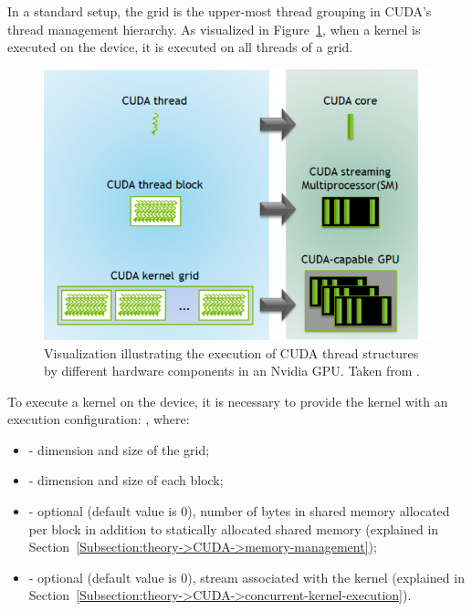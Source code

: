 In a standard setup, the grid is the upper-most thread grouping in CUDA's thread management hierarchy.
As visualized in Figure~\ref{Figure:theory->CUDA->thread-management->thread-structures-executed-by-hardware}, when a kernel is executed on the device, it is executed on all threads of a grid.

\begin{figure}[ht!]
	\centering
	\includegraphics[width=12cm, keepaspectratio]{images/ch01/CUDA_structures_executed_by_hardware.png}
	\caption{Visualization illustrating the execution of CUDA thread structures by different hardware components in an Nvidia GPU.
		Taken from  \cite{Gupta26June2020}.
	}
	\label{Figure:theory->CUDA->thread-management->thread-structures-executed-by-hardware}
\end{figure}

To execute a kernel on the device, it is necessary to provide the kernel with an execution configuration: , where:
\begin{itemize}
	\item {} - dimension and size of the grid;
	\item {} - dimension and size of each block;
	\item {} - optional (default value is 0), number of bytes in shared memory allocated per block in addition to statically allocated shared memory (explained in Section~\ref{Subsection:theory->CUDA->memory-management});
	\item {} - optional (default value is 0), stream associated with the kernel (explained in Section~\ref{Subsection:theory->CUDA->concurrent-kernel-execution}).
\end{itemize}

